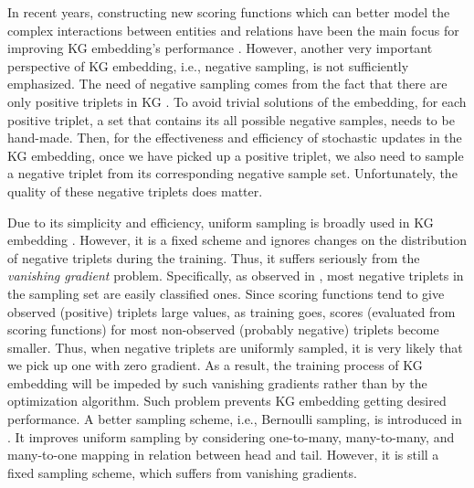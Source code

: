 \documentclass[conference]{IEEEtran}
\begin{document}
In recent years,
constructing new scoring functions which can better model the complex interactions between entities and relations 
have been the main focus for improving KG embedding's performance
\cite{wang2014knowledge,ji2015knowledge,yang2014embedding,trouillon2016complex}.
However,
another very important perspective of KG embedding,
i.e., negative sampling, is not sufficiently emphasized.
The need of negative sampling comes from the fact that there are only positive triplets in KG \cite{drumond2012predicting}.
To avoid trivial solutions of the embedding,
for each positive triplet, a set
that contains its all possible negative samples,
needs to be hand-made.
Then,
for the effectiveness and efficiency of stochastic updates in the KG embedding,
once we have picked up a positive triplet,
we also need to sample a negative triplet from its corresponding negative sample set.
Unfortunately,
the quality of these negative triplets does matter.

Due to its simplicity and efficiency,
uniform sampling is broadly used in KG embedding \cite{wang2017knowledge}.
However,
it is a fixed scheme and ignores changes on the distribution of negative triplets during the training.
Thus,
it suffers seriously from the \textit{vanishing gradient} problem.
Specifically,
as observed in \cite{wang2018incorporating},
most negative triplets in the sampling set are easily classified ones.
{Since scoring functions tend to give observed (positive) triplets large values,
	as training goes,
	scores (evaluated from scoring functions) for most non-observed (probably negative) triplets become smaller.
Thus, 
	when negative triplets are uniformly sampled,
	it is very likely that we pick up one with zero gradient.
	As a result, 
	the training process of KG embedding 
	will be impeded by such vanishing gradients rather than by the optimization algorithm.
	Such problem prevents KG embedding getting desired performance.}
A better sampling scheme,
i.e.,
Bernoulli sampling, 
is introduced in \cite{wang2014knowledge}.
It improves uniform sampling
by considering one-to-many,
many-to-many,
and many-to-one mapping in relation between head and tail.
However,
it is still a fixed sampling scheme,
which suffers from vanishing gradients.
\end{document}
